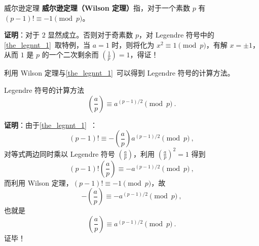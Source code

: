 
\begin{theorem}{威尔逊定理}
\textbf{威尔逊定理（Wilson 定理）}指，对于一个素数 $p$ 有 $(p-1)! \equiv -1 \pmod p$。
\end{theorem}
\textbf{证明}：对于 $2$ 显然成立。否则对于奇素数 $p$，对 Legendre 符号中的\autoref{the_legnnt_1}~取特例，当 $a=1$ 时，则将化为 $x^2 \equiv 1 \pmod p$，有解 $x = \pm 1$，从而 $1$ 是 $p$ 的一个二次剩余而 $\left(\frac 1p\right)=1$，得证！

利用 Wilson 定理与\autoref{the_legnnt_1}~可以得到 Legendre 符号的计算方法。
\begin{theorem}{Legendre 符号的计算方法}\label{the_wilsth_1}
\begin{equation}
\left(\frac ap\right) \equiv a^{(p-1)/2} \pmod p ~.
\end{equation}
\end{theorem}
\textbf{证明}：由于\autoref{the_legnnt_1}~：
\begin{equation}
(p-1)! \equiv -\left(\frac ap\right) a^{(p-1)/2} \pmod p ~,
\end{equation}
对等式两边同时乘以 Legendre 符号 $\left(\frac ap\right)$，利用 $\left(\frac ap\right)^2 = 1$ 得到
\begin{equation}
(p-1)!\left(\frac ap\right) \equiv - a^{(p-1)/2} \pmod p ~,
\end{equation}
而利用 Wilson 定理，$(p-1)! \equiv -1 \pmod p$，故
\begin{equation}
-\left(\frac ap\right) \equiv - a^{(p-1)/2} \pmod p ~,
\end{equation}
也就是
\begin{equation}
\left(\frac ap\right) \equiv a^{(p-1)/2} \pmod p ~.
\end{equation}
证毕！